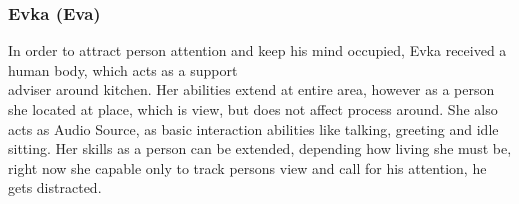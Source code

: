 \documentclass[18pt]{article}
\numberwithin{equation}{section} %
\numberwithin{figure}{section} %
\numberwithin{table}{section} %
\begin{document}
		\subsubsection{Evka (Eva)}
			In order to attract person attention and keep his mind occupied, Evka received a human body, which acts as a support\\adviser around kitchen. Her abilities extend at entire area, however as a person she located at place, which is  view, but does not affect process around. She also acts as Audio Source, as basic interaction abilities like talking, greeting and idle sitting. Her skills as a person can be extended, depending how living she must be, right now she capable only to track persons view and call for his attention, he gets distracted. \\
			
\end{document}
